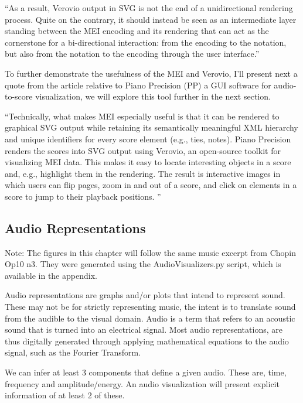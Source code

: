 ``As a result, Verovio output in SVG is not the end of a unidirectional rendering process. Quite on the contrary, it should instead be seen as an intermediate layer standing between the MEI encoding and its rendering that can act as the cornerstone for a bi-directional interaction: from the encoding to the notation, but also from the notation to the encoding through the user interface.''\citep{repertoireinternationaldessourcesmusicalesVerovioReferenceBook2021}

To further demonstrate the usefulness of the MEI and Verovio, I'll present next a quote from the article relative to Piano Precision (PP) a GUI software for audio-to-score visualization, we will explore this tool further in the next section.

``Technically, what makes MEI especially useful is that it can be rendered to graphical SVG output while retaining its semantically meaningful XML hierarchy and unique identifiers for every score element (e.g., ties, notes). Piano Precision renders the scores into SVG output using Verovio, an open-source toolkit for visualizing MEI data. This makes it easy to locate interesting objects in a score and, e.g., highlight them in the rendering. The result is interactive images in which users can flip pages, zoom in and out of a score, and click on elements in a score to jump to their playback positions. ''\citep{jiangPIANOPRECISIONADVANCING2025}

\subsection{Audio Representations}
Note: The figures in this chapter will follow the same music excerpt from Chopin Op10 n3. They were generated using the AudioVisualizers.py script, which is available in the appendix.

Audio representations are graphs and/or plots that intend to represent sound. These may not be for strictly representing music, the intent is to translate sound from the audible to the visual domain. Audio is a term that refers to an acoustic sound that is turned into an electrical signal. Most audio representations, are thus digitally generated through applying mathematical equations to the audio signal, such as the Fourier Transform. 

We can infer at least 3 components that define a given audio. These are, time, frequency and amplitude/energy. An audio visualization will present explicit information of at least 2 of these.

